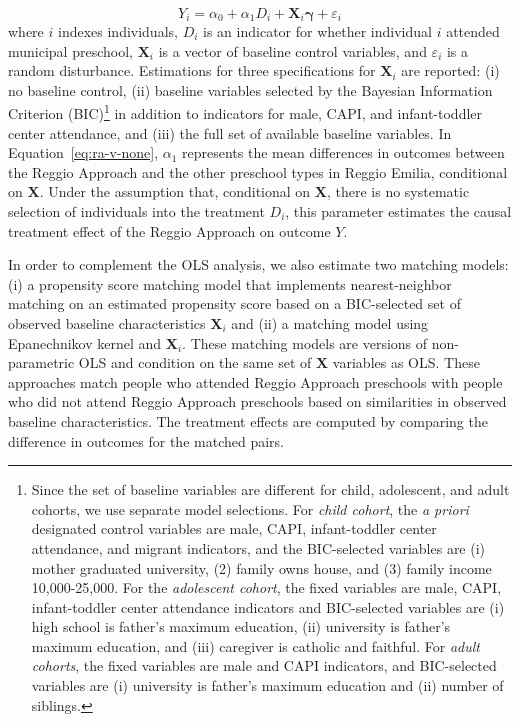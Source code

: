 \begin{equation}
	Y_i = \alpha_0 + \alpha_1 D_i + \bm{X}_i \bm{\gamma} + \varepsilon_i
	\label{eq:ra-v-none}
\end{equation}
where $i$ indexes individuals, $D_i$ is an indicator for whether individual $i$ attended municipal preschool, $\bm{X}_i$ is a vector of baseline control variables, and $\varepsilon_i$ is a random disturbance. Estimations for three specifications for $\bm{X}_i$ are reported: (i) no baseline control, (ii) baseline variables selected by the Bayesian Information Criterion (BIC)\footnote{Since the set of baseline variables are different for child, adolescent, and adult cohorts, we use separate model selections. For \emph{child cohort}, the \emph{a priori} designated control variables are male, CAPI, infant-toddler center attendance, and migrant indicators, and the BIC-selected variables are (i) mother graduated university, (2) family owns house, and (3) family income 10,000-25,000. For the \emph{adolescent cohort}, the fixed variables are male, CAPI, infant-toddler center attendance indicators and BIC-selected variables are (i) high school is father's maximum education, (ii) university is father's maximum education, and (iii) caregiver is catholic and faithful. For \emph{adult cohorts}, the fixed variables are male and CAPI indicators, and BIC-selected variables are (i) university is father's maximum education and (ii) number of siblings.} in addition to indicators for male, CAPI, and infant-toddler center attendance, and (iii) the full set of available baseline variables. In Equation~\eqref{eq:ra-v-none}, $\alpha_1$ represents the mean differences in outcomes between the Reggio Approach and the other preschool types in Reggio Emilia, conditional on $\bm{X}$. Under the assumption that, conditional on $\bm{X}$, there is no systematic selection of individuals into the treatment $D_i$, this parameter estimates the causal treatment effect of the Reggio Approach on outcome $Y$.

In order to complement the OLS analysis, we also estimate two matching models: (i) a propensity score matching model that implements nearest-neighbor matching on an estimated propensity score based on a BIC-selected set of observed baseline characteristics $\boldsymbol{X}_i$ and (ii) a matching model using Epanechnikov kernel and $\boldsymbol{X}_i$. These matching models are versions of non-parametric OLS and condition on the same set of $\bm{X}$ variables as OLS. These approaches match people who attended Reggio Approach preschools with people who did not attend Reggio Approach preschools based on similarities in observed baseline characteristics. The treatment effects are computed by comparing the difference in outcomes for the matched pairs. 

